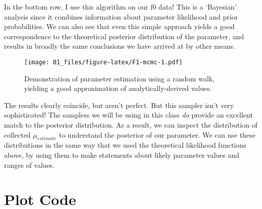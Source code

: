\documentclass[
]{book}
\begin{document}
In the bottom row, I use this algorithm on our f0 data! This is a `Bayesian' analysis since it combines information about parameter likelihood and prior probabilities. We can also see that even this simple approach yields a good correspondence to the theoretical posterior distribution of the parameter, and results in broadly the same conclusions we have arrived at by other means.

\begin{figure}
\centering
\texttt{[image: 01\_files/figure-latex/F1-mcmc-1.pdf]}
\caption{\label{fig:F1-mcmc}Demonstration of parameter estimation using a random walk, yielding a good approximation of analytically-derived values.}
\end{figure}

The results clearly coincide, but aren't perfect. But this sampler isn't very sophisticated! The samplers we will be using in this class \emph{do} provide an excellent match to the posterior distribution. As a result, we can inspect the distribution of collected \(\mu_{estimate}\) to understand the posterior of our parameter. We can use these distributions in the same way that we used the theoretical likelihood functions above, by using them to make statements about likely parameter values and ranges of values.

\hypertarget{plot-code}{%
\section{Plot Code}\label{plot-code}}
\end{document}
